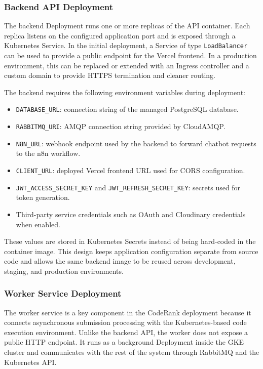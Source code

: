 \subsubsection{Backend API Deployment}

The backend Deployment runs one or more replicas of the API container. Each replica listens on the configured application port and is exposed through a Kubernetes Service. In the initial deployment, a Service of type \texttt{LoadBalancer} can be used to provide a public endpoint for the Vercel frontend. In a production environment, this can be replaced or extended with an Ingress controller and a custom domain to provide HTTPS termination and cleaner routing.

The backend requires the following environment variables during deployment:

\begin{itemize}
    \item \texttt{DATABASE\_URL}: connection string of the managed PostgreSQL database.
    \item \texttt{RABBITMQ\_URI}: AMQP connection string provided by CloudAMQP.
    \item \texttt{N8N\_URL}: webhook endpoint used by the backend to forward chatbot requests to the n8n workflow.
    \item \texttt{CLIENT\_URL}: deployed Vercel frontend URL used for CORS configuration.
    \item \texttt{JWT\_ACCESS\_SECRET\_KEY} and \texttt{JWT\_REFRESH\_SECRET\_KEY}: secrets used for token generation.
    \item Third-party service credentials such as OAuth and Cloudinary credentials when enabled.
\end{itemize}

These values are stored in Kubernetes Secrets instead of being hard-coded in the container image. This design keeps application configuration separate from source code and allows the same backend image to be reused across development, staging, and production environments.

\subsubsection{Worker Service Deployment}

The worker service is a key component in the CodeRank deployment because it connects asynchronous submission processing with the Kubernetes-based code execution environment. Unlike the backend API, the worker does not expose a public HTTP endpoint. It runs as a background Deployment inside the GKE cluster and communicates with the rest of the system through RabbitMQ and the Kubernetes API.

